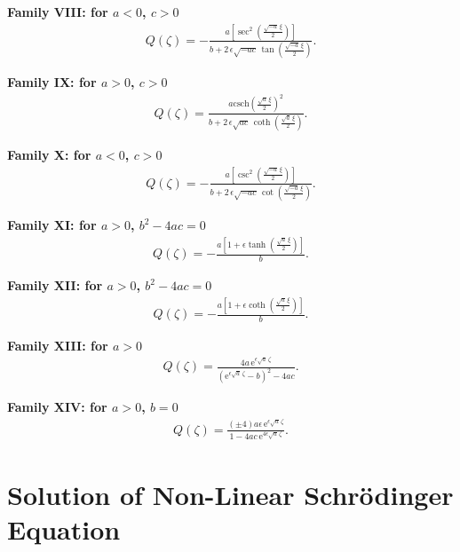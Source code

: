 \documentclass[10pt]{NSP1}
\numberwithin{equation}{section}
\begin{document}
\textbf{Family VIII: for $a < 0$, $c > 0$ }
\begin{eqnarray}\label{F8}
Q \! \left(\zeta \right) =-\frac{a \left[\sec^{2}\left(\frac{\sqrt{-a}\, \xi}{2}\right)\right]}{b +2\,\epsilon  \sqrt{-a c}\, \tan \! \left(\frac{\sqrt{-a}\, \xi}{2}\right)}.
\end{eqnarray}

\textbf{Family IX: for $a > 0$, $c > 0$ }
\begin{eqnarray}\label{F9}
Q \! \left(\zeta \right) =\frac{a \mathrm{csch}\! \left(\frac{\sqrt{a}\, \xi}{2}\right)^{2}}{b +2\,\epsilon  \sqrt{a c}\, \coth \! \left(\frac{\sqrt{a}\, \xi}{2}\right)}.
\end{eqnarray}

\textbf{Family X: for $a < 0$, $c > 0$ }
\begin{eqnarray}\label{F10}
Q \! \left(\zeta \right) =-\frac{a \left[\csc^{2}\left(\frac{\sqrt{-a}\, \xi}{2}\right)\right]}{b +2\,\epsilon  \sqrt{-a c}\, \cot \! \left(\frac{\sqrt{-a}\, \xi}{2}\right)}.
\end{eqnarray}

\textbf{Family XI: for $a > 0$, $b^{2}-4ac = 0$ }
\begin{eqnarray}\label{F11}
Q \! \left(\zeta \right) =-\frac{a \left[1+\epsilon  \tanh \! \left(\frac{\sqrt{a}\, \xi}{2}\right)\right]}{b}.
\end{eqnarray}

\textbf{Family XII: for $a > 0$, $b^{2}-4ac = 0$ }
\begin{eqnarray}\label{F12}
Q \! \left(\zeta \right) =-\frac{a \left[1+\epsilon  \coth \! \left(\frac{\sqrt{a}\, \xi}{2}\right)\right]}{b}.
\end{eqnarray}

\textbf{Family XIII: for $a > 0$ }
\begin{eqnarray}\label{F13}
Q \! \left(\zeta \right) =\frac{4 a \,{\mathrm e}^{\epsilon  \sqrt{a}\, \zeta}}{\left({\mathrm e}^{\epsilon  \sqrt{a}\, \zeta}-b \right)^{2}-4 a c}.
\end{eqnarray}

\textbf{Family XIV: for $a > 0$, $b = 0$ }
\begin{eqnarray}\label{F14}
Q \! \left(\zeta \right) =\frac{\left(\pm 4\right) a \epsilon  \,{\mathrm e}^{\epsilon  \sqrt{a}\, \zeta}}{1-4 a c \,{\mathrm e}^{4 \epsilon  \sqrt{a}\, \zeta}}.
\end{eqnarray}

\section{Solution of Non-Linear Schr\"odinger Equation}
\end{document}
